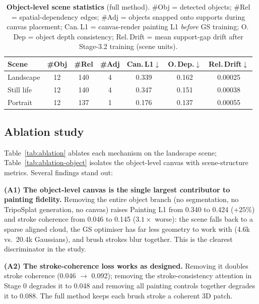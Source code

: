 \documentclass[10pt,twocolumn,letterpaper]{article}
\begin{document}
\begin{table}[t]
\centering
\scriptsize
\setlength{\tabcolsep}{3pt}
\begin{tabular*}{\linewidth}{@{\extracolsep{\fill}}lcccccc}
\toprule
Scene & \#Obj & \#Rel & \#Adj & Can.\,L1$\downarrow$ & O.\,Dep.$\downarrow$ & Rel.\,Drift$\downarrow$ \\
\midrule
Landscape   & 12 & 140 & 4 & 0.339 & 0.162 & 0.00025 \\
Still life  & 12 & 140 & 4 & 0.347 & 0.151 & 0.00038 \\
Portrait    & 12 & 137 & 1 & 0.176 & 0.137 & 0.00055 \\
\bottomrule
\end{tabular*}
\caption{\textbf{Object-level scene statistics} (full method). \#Obj =
detected objects; \#Rel = spatial-dependency edges; \#Adj = objects snapped
onto supports during canvas placement; Can.\,L1 = canvas-render painting L1
\emph{before} GS training; O.\,Dep = object depth consistency; Rel.\,Drift
= mean support-gap drift after Stage-3.2 training (scene units).}
\label{tab:object-main}
\end{table}

\subsection{Ablation study}
\label{sec:exp-ablation}

Table~\ref{tab:ablation} ablates each mechanism on the landscape scene;
Table~\ref{tab:ablation-object} isolates the object-level canvas with
scene-structure metrics. Several findings stand out:

\textbf{(A1) The object-level canvas is the single largest contributor to
painting fidelity.} Removing the entire object branch (no segmentation, no
TripoSplat generation, no canvas) raises Painting L1 from 0.340 to 0.424
($+25\%$) and stroke coherence from 0.046 to 0.145 ($3.1\times$ worse): the
scene falls back to a sparse aligned cloud, the GS optimiser has far less
geometry to work with (4.6k vs.\ 20.4k Gaussians), and brush strokes blur
together. This is the clearest discriminator in the study.

\textbf{(A2) The stroke-coherence loss works as designed.} Removing it
doubles stroke coherence (0.046 $\to$ 0.092); removing the
stroke-consistency attention in Stage 0 degrades it to 0.048 and removing
all painting controls together degrades it to 0.088. The full method keeps
each brush stroke a coherent 3D patch.
\end{document}
